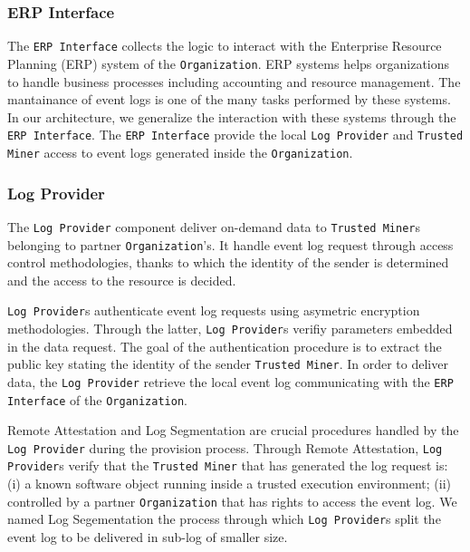 \subsubsection{ERP Interface}
The \texttt{ERP Interface} collects the logic to interact with the Enterprise Resource Planning (ERP) system  of the \texttt{Organization}. ERP systems helps organizations to
handle business processes including accounting and resource management. The mantainance of event logs is one of the many tasks performed by these systems. In our architecture, we generalize the interaction with these systems through the \texttt{ERP Interface}. The \texttt{ERP Interface} provide the local \texttt{Log Provider} and \texttt{Trusted Miner} access to event logs generated inside the \texttt{Organization}.
\subsubsection{Log Provider}
The \texttt{Log Provider} component deliver on-demand data to \texttt{Trusted Miner}s belonging to partner \texttt{Organization}'s. It handle event log request through access control methodologies, thanks to which the identity of the sender is determined and the access to the resource is decided.

\texttt{Log Provider}s authenticate event log requests using asymetric encryption methodologies. Through the latter, \texttt{Log Provider}s verifiy parameters embedded in the data request. The goal of the authentication procedure is to extract the public key stating the identity of the sender \texttt{Trusted Miner}. In order to deliver data, the \texttt{Log Provider} retrieve the local event log communicating with the \texttt{ERP Interface} of the \texttt{Organization}.

Remote Attestation and Log Segmentation are crucial procedures handled by the \texttt{Log Provider} during the provision process. Through Remote Attestation, \texttt{Log Provider}s verify that the \texttt{Trusted Miner} that has generated the log request  is: (i) a known software object running inside a trusted execution environment; (ii) controlled by a partner \texttt{Organization} that has rights to access the event log. We named Log Segementation the process through which \texttt{Log Provider}s split the event log to be delivered in sub-log of smaller size.

